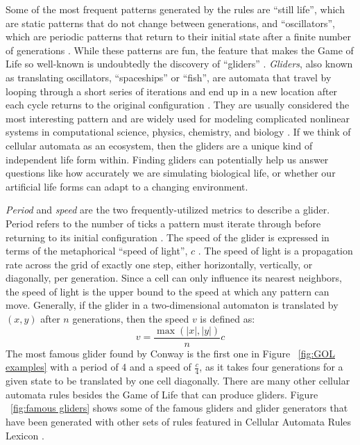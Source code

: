 \documentclass[12pt]{article}
\numberwithin{figure}{section} %
\begin{document}
Some of the most frequent patterns generated by the rules are “still life”, which are static patterns that do not change between generations, and “oscillators”, which are periodic patterns that return to their initial state after a finite number of generations \cite{Cellular automaton}. While these patterns are fun, the feature that makes the Game of Life so well-known is undoubtedly the discovery of “gliders” \cite{Glider}. \textit{Gliders}, also known as translating oscillators, “spaceships” or “fish”, are automata that travel by looping through a short series of iterations and end up in a new location after each cycle returns to the original configuration \cite{rake}. They are usually considered the most interesting pattern and are widely used for modeling complicated nonlinear systems in computational science, physics, chemistry, and biology \cite{Cellular automaton}. If we think of cellular automata as an ecosystem, then the gliders are a unique kind of independent life form within. Finding gliders can potentially help us answer questions like how accurately we are simulating biological life, or whether our artificial life forms can adapt to a changing environment. 

\textit{Period} and \textit{speed} are the two frequently-utilized metrics to describe a glider. Period refers to the number of ticks a pattern must iterate through before returning to its initial configuration \cite{The Game of Life}. The speed of the glider is expressed in terms of the metaphorical “speed of light”, $c$ \cite{spaceship, speed of light}. The speed of light is a propagation rate across the grid of exactly one step, either horizontally, vertically, or diagonally, per generation. Since a cell can only influence its nearest neighbors, the speed of light is the upper bound to the speed at which any pattern can move. Generally, if the glider in a two-dimensional automaton is translated by $(x,y)$ after $n$ generations, then the speed $v$ is defined as: 
$$v = \frac{\max(|x|, |y|)}{n}c$$
The most famous glider found by Conway is the first one in Figure ~\ref{fig:GOL examples} with a period of 4 and a speed of $\frac{c}{4}$, as it takes four generations for a given state to be translated by one cell diagonally. There are many other cellular automata rules besides the Game of Life that can produce gliders. Figure ~\ref{fig:famous gliders} shows some of the famous gliders and glider generators that have been generated with other sets of rules featured in Cellular Automata Rules Lexicon \cite{Lexicon}. 
\end{document}
